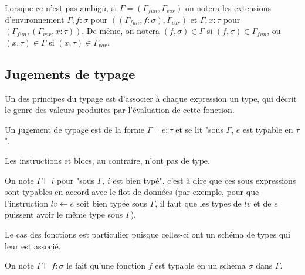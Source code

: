 
Lorsque ce n'est pas ambigü, si $Γ=(Γ_{fun},Γ_{var})$ on notera les extensions
d'environnement $Γ,f:σ$ pour $((Γ_{fun},f:σ), Γ_{var})$ et $Γ,x:τ$ pour
$(Γ_{fun},(Γ_{var},x:τ))$. De même, on notera $(f, σ) ∈ Γ$ si $(f, σ) ∈
Γ_{fun}$, ou $(x, τ) ∈ Γ$ si $(x, τ) ∈ Γ_{var}$.

\subsection{Jugements de typage}

Un des principes du typage est d'associer à chaque expression un type, qui
décrit le genre des valeurs produites par l'évaluation de cette fonction.

\begin{definition}
Un jugement de typage est de la forme $Γ ⊢ e : τ$ et se lit "sous $Γ$, $e$ est
typable en $τ$".
\end{definition}

Les instructions et blocs, au contraire, n'ont pas de type.

\begin{definition}
On note $Γ ⊢ i$ pour "sous $Γ$, $i$ est bien typé", c'est à dire que ces sous
expressions sont typables en accord avec le flot de données (par exemple, pour
que l'instruction $lv \leftarrow e$ soit bien typée sous $Γ$, il faut que les
types de $lv$ et de $e$ puissent avoir le même type sous $Γ$).
\end{definition}

Le cas des fonctions est particulier puisque celles-ci ont un schéma de types
qui leur est associé.

\begin{definition}
On note $Γ ⊢ f : σ$ le fait qu'une fonction $f$ est typable en un schéma $σ$ dans $Γ$.
\end{definition}

